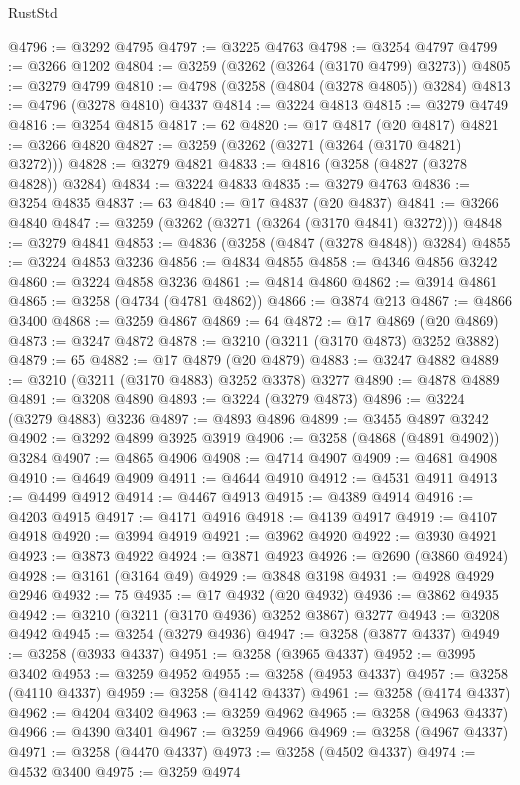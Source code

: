 \begin{lexlean}{RustStd}
\begin{coremodule}
@4796 := @3292 @4795
@4797 := @3225 @4763
@4798 := @3254 @4797
@4799 := @3266 @1202
@4804 := @3259 (@3262 (@3264 (@3170 @4799) @3273))
@4805 := @3279 @4799
@4810 := @4798 (@3258 (@4804 (@3278 @4805)) @3284)
@4813 := @4796 (@3278 @4810) @4337
@4814 := @3224 @4813
@4815 := @3279 @4749
@4816 := @3254 @4815
@4817 := 62
@4820 := @17 @4817 (@20 @4817)
@4821 := @3266 @4820
@4827 := @3259 (@3262 (@3271 (@3264 (@3170 @4821) @3272)))
@4828 := @3279 @4821
@4833 := @4816 (@3258 (@4827 (@3278 @4828)) @3284)
@4834 := @3224 @4833
@4835 := @3279 @4763
@4836 := @3254 @4835
@4837 := 63
@4840 := @17 @4837 (@20 @4837)
@4841 := @3266 @4840
@4847 := @3259 (@3262 (@3271 (@3264 (@3170 @4841) @3272)))
@4848 := @3279 @4841
@4853 := @4836 (@3258 (@4847 (@3278 @4848)) @3284)
@4855 := @3224 @4853 @3236
@4856 := @4834 @4855
@4858 := @4346 @4856 @3242
@4860 := @3224 @4858 @3236
@4861 := @4814 @4860
@4862 := @3914 @4861
@4865 := @3258 (@4734 (@4781 @4862))
@4866 := @3874 @213
@4867 := @4866 @3400
@4868 := @3259 @4867
@4869 := 64
@4872 := @17 @4869 (@20 @4869)
@4873 := @3247 @4872
@4878 := @3210 (@3211 (@3170 @4873) @3252 @3882)
@4879 := 65
@4882 := @17 @4879 (@20 @4879)
@4883 := @3247 @4882
@4889 := @3210 (@3211 (@3170 @4883) @3252 @3378) @3277
@4890 := @4878 @4889
@4891 := @3208 @4890
@4893 := @3224 (@3279 @4873)
@4896 := @3224 (@3279 @4883) @3236
@4897 := @4893 @4896
@4899 := @3455 @4897 @3242
@4902 := @3292 @4899 @3925 @3919
@4906 := @3258 (@4868 (@4891 @4902)) @3284
@4907 := @4865 @4906
@4908 := @4714 @4907
@4909 := @4681 @4908
@4910 := @4649 @4909
@4911 := @4644 @4910
@4912 := @4531 @4911
@4913 := @4499 @4912
@4914 := @4467 @4913
@4915 := @4389 @4914
@4916 := @4203 @4915
@4917 := @4171 @4916
@4918 := @4139 @4917
@4919 := @4107 @4918
@4920 := @3994 @4919
@4921 := @3962 @4920
@4922 := @3930 @4921
@4923 := @3873 @4922
@4924 := @3871 @4923
@4926 := @2690 (@3860 @4924)
@4928 := @3161 (@3164 @49)
@4929 := @3848 @3198
@4931 := @4928 @4929 @2946
@4932 := 75
@4935 := @17 @4932 (@20 @4932)
@4936 := @3862 @4935
@4942 := @3210 (@3211 (@3170 @4936) @3252 @3867) @3277
@4943 := @3208 @4942
@4945 := @3254 (@3279 @4936)
@4947 := @3258 (@3877 @4337)
@4949 := @3258 (@3933 @4337)
@4951 := @3258 (@3965 @4337)
@4952 := @3995 @3402
@4953 := @3259 @4952
@4955 := @3258 (@4953 @4337)
@4957 := @3258 (@4110 @4337)
@4959 := @3258 (@4142 @4337)
@4961 := @3258 (@4174 @4337)
@4962 := @4204 @3402
@4963 := @3259 @4962
@4965 := @3258 (@4963 @4337)
@4966 := @4390 @3401
@4967 := @3259 @4966
@4969 := @3258 (@4967 @4337)
@4971 := @3258 (@4470 @4337)
@4973 := @3258 (@4502 @4337)
@4974 := @4532 @3400
@4975 := @3259 @4974

\end{coremodule}
\end{lexlean}
